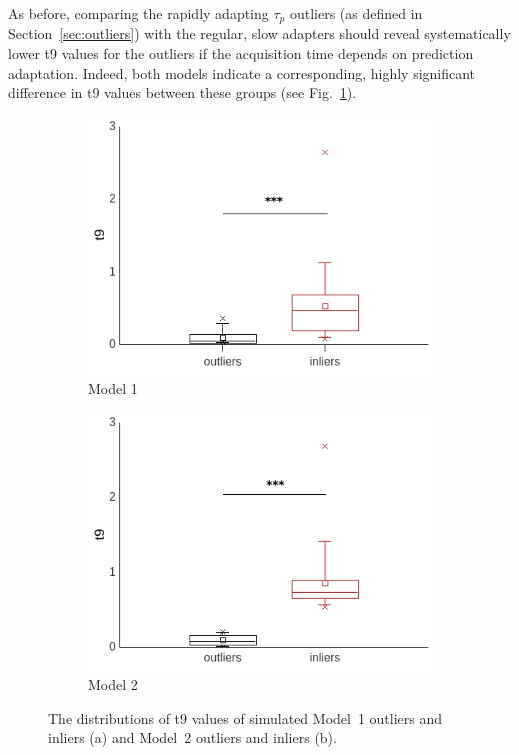 \documentclass[a4paper]{scrreprt}
\begin{document}
As before, comparing the rapidly adapting $\tau_p$ outliers (as defined in Section~\ref{sec:outliers}) with the regular, slow adapters should reveal systematically lower t9 values for the outliers if the acquisition time depends on prediction adaptation. Indeed, both models indicate a corresponding, highly significant difference in t9 values between these groups (see Fig.~\ref{fig:outliers_t9}).



\begin{figure}
\centering
\begin{subfigure}[b]{0.49\textwidth}
        \includegraphics[width=\textwidth]{figs/sec3/outliers/outliers_t9_mod1.jpeg}
        \caption{Model 1}
    \end{subfigure}
    \begin{subfigure}[b]{0.49\textwidth}
        \includegraphics[width=\textwidth]{figs/sec3/outliers/outliers_t9_mod2.jpeg}
        \caption{Model 2}
    \end{subfigure}
\caption{The distributions of t9 values of simulated Model~1 outliers and inliers (a) and Model~2 outliers and inliers (b).}
\label{fig:outliers_t9}
\end{figure}
\end{document}
